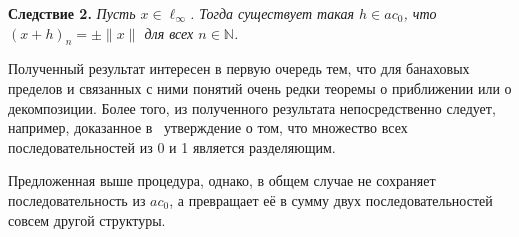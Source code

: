 \documentclass[a4paper,14pt]{article}
\begin{document}
\medskip

\textbf{Следствие 2.} {\sl
	Пусть $x\in\ell_\infty$.
	Тогда существует такая $h\in ac_0$, что $(x+h)_n =\pm \|x\|$ для всех $n\in\mathbb N$.
}

\medskip

Полученный результат интересен в первую очередь тем, что для банаховых пределов и связанных с ними понятий
очень редки теоремы о приближении или о декомпозиции.
Более того, из полученного результата непосредственно следует, например,
доказанное в~\cite{semenov2010characteristic} утверждение о том, что множество всех последовательностей из 0 и 1 является разделяющим.

Предложенная выше процедура, однако, в общем случае не сохраняет последовательность из $ac_0$,
а превращает её в сумму двух последовательностей совсем другой структуры.



\setcounter{equation}{0}
\setcounter{figure}{0}
\end{document}
